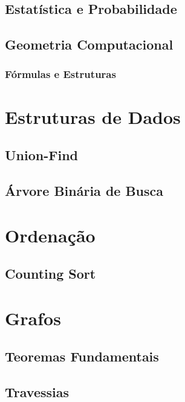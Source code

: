     \section{Estatística e Probabilidade}
        
        \newpage
        
        \newpage
    \section{Geometria Computacional}
        \subsection{Fórmulas e Estruturas}
            
            \newpage
        
\chapter{Estruturas de Dados}
    \section{Union-Find}
        
        \newpage
    \section{Árvore Binária de Busca}
        
        \newpage

% 

\chapter{Ordenação}
    \section{Counting Sort}
        
\newpage

\chapter{Grafos}
    \section{Teoremas Fundamentais}
        
        \newpage
    \section{Travessias}
        
        
        
        
        \newpage
